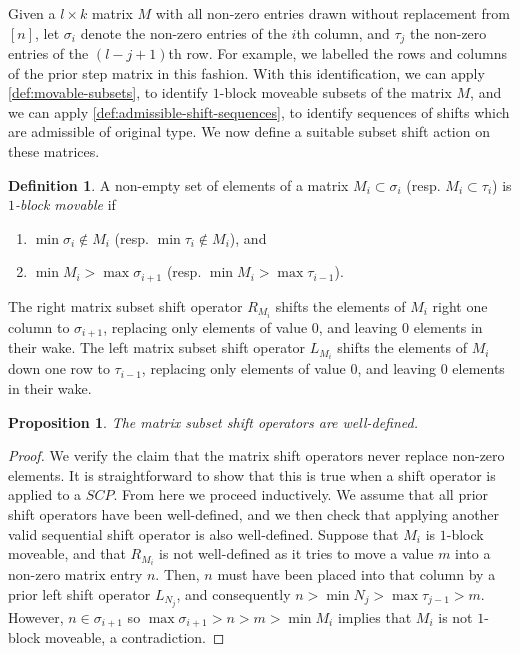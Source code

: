 \documentclass{amsart}
\newtheorem{proposition}[theorem]{Proposition}
\theoremstyle{definition}
\newtheorem{definition}[theorem]{Definition}
\begin{document}
Given a $l\times k$ matrix $M$ with all non-zero entries drawn without replacement from $[n]$, let $\sigma_i$ denote the non-zero entries of the $i$th column, and $\tau_j$ the non-zero entries of the $(l-j+1)$th row. 
For example, we labelled the rows and columns of the prior step matrix in this fashion.
With this identification, we can apply \cref{def:movable-subsets}, to identify $1$-block moveable subsets of the matrix $M$, and we can apply \cref{def:admissible-shift-sequences}, to identify sequences of shifts which are admissible of original type.
We now define a suitable subset shift action on these matrices.
\begin{definition}
A non-empty set of elements of a matrix $M_i \subset \sigma_i$ (resp. $M_{i}\subset \tau_{i}$) is \emph{$1$-block movable} if
\begin{enumerate}
    \item $\min \sigma_i \notin M_i$ (resp. $\min \tau_{i} \notin M_i$), and
    \item $\min M_i> \max \sigma_{i+1}$ (resp. $\min M_{i}> \max \tau_{i-1}$).
\end{enumerate}
The right matrix subset shift operator $R_{M_i}$ shifts the elements of $M_i$ right one column to $\sigma_{i+1}$, replacing only elements of value $0$, and leaving $0$ elements in their wake.
The left matrix subset shift operator $L_{M_i}$ shifts the elements of $M_i$ down one row to $\tau_{i-1}$, replacing only elements of value $0$, and leaving $0$ elements in their wake.
\end{definition}
\begin{proposition}
The matrix subset shift operators are well-defined.
\end{proposition}
\begin{proof}
We verify the claim that the matrix shift operators never replace non-zero elements.
It is straightforward to show that this is true when a shift operator is applied to a $SCP$.
From here we proceed inductively.
We assume that all prior shift operators have been well-defined, and we then check that applying another valid sequential shift operator is also well-defined.
Suppose that $M_i$ is $1$-block moveable, and that $R_{M_i}$ is not well-defined as it tries to move a value $m$ into a non-zero matrix entry $n$.
Then, $n$ must have been placed into that column by a prior left shift operator $L_{N_j}$, and consequently $n>\min N_j > \max \tau_{j-1}> m$.
However, $n\in \sigma_{i+1}$ so $\max \sigma_{i+1}>n>m>\min M_i $ implies that $M_i$ is not $1$-block moveable, a contradiction.
\end{proof}
\end{document}
